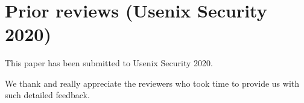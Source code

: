 \newpage
~\\
\newpage

\section{Prior reviews (Usenix Security 2020)}
\label{appendix:past-reviews2}

This paper has been submitted to Usenix Security 2020.

We thank and really appreciate the reviewers who took time to provide us with
such detailed feedback.

